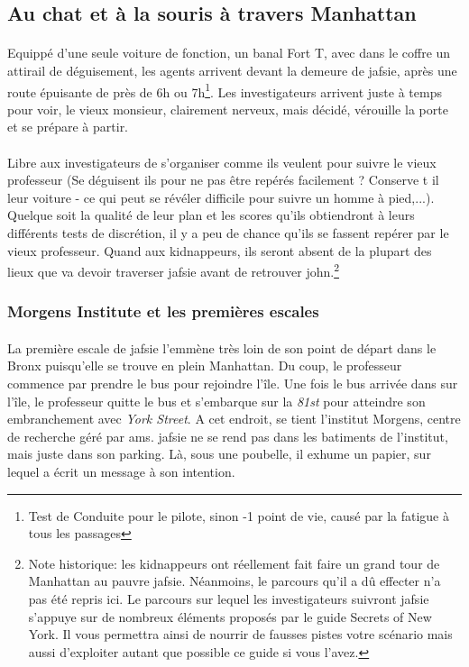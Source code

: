 
\subsection{Au chat et à la souris à travers Manhattan}



\paragraph{} Equippé d'une seule voiture de fonction, un banal Fort T, avec dans le coffre un attirail de déguisement, les 
agents arrivent devant la demeure de \gls{jafsie}, après une route épuisante de près de 6h ou 7h\footnote{Test de Conduite pour 
le pilote, sinon -1 point de vie, causé par la fatigue à tous les passages}. Les investigateurs arrivent juste à temps pour voir, 
le vieux monsieur, clairement nerveux, mais décidé, vérouille la porte et se prépare à partir.

\paragraph{} Libre aux investigateurs de s'organiser comme ils veulent pour suivre le vieux professeur (Se déguisent ils pour ne 
pas être repérés facilement ? Conserve t il leur voiture - ce qui peut se révéler difficile pour suivre un homme à pied,...). Quelque
soit la qualité de leur plan et les scores qu'ils obtiendront à leurs différents tests de discrétion, il y a peu de chance qu'ils se
fassent repérer par le vieux professeur. Quand aux kidnappeurs, ils seront absent de la plupart des lieux que va devoir traverser 
\gls{jafsie} avant de retrouver \gls{john}.\footnote{Note historique: les kidnappeurs ont réellement fait faire un grand tour de 
Manhattan au pauvre \gls{jafsie}. Néanmoins, le parcours qu'il a dû effecter n'a pas été repris ici. Le parcours sur lequel les 
investigateurs suivront \gls{jafsie} s'appuye sur de nombreux éléments proposés par le guide Secrets of New York. Il vous permettra
ainsi de nourrir de fausses pistes votre scénario mais aussi d'exploiter autant que possible ce guide si vous l'avez.}

\subsubsection{Morgens Institute et les premières escales}

\paragraph{} La première escale de \gls{jafsie} l'emmène très loin de son point de départ dans le Bronx puisqu'elle se trouve en
plein Manhattan. Du coup, le professeur commence par prendre le bus pour rejoindre l'île. Une fois le bus arrivée dans sur l'île, 
le professeur quitte le bus et s'embarque sur la \emph{81st} pour atteindre son embranchement avec \emph{York Street}. A cet endroit,
se tient l'institut Morgens, centre de recherche géré par \gls{ams}. \gls{jafsie} ne se rend pas dans les batiments de l'institut, mais
juste dans son parking. Là, sous une poubelle, il exhume un papier, sur lequel a écrit un message à son intention.

